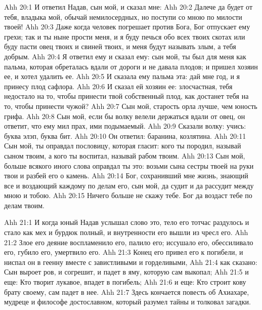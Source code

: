 \vs Ahh 20:1
И ответил Надав, сын мой, и сказал мне:
\vs Ahh 20:2
Далече да будет от тебя, владыка мой, обычай немилосердных, но поступи со мною по милости твоей!
\vs Ahh 20:3
Даже когда человек погрешает против Бога, Бог отпускает ему грехи; так и ты ныне прости меня, и я буду печься обо всех твоих скотах или буду пасти овец твоих и свиней твоих, и меня будут называть злым, а тебя добрым.
\vs Ahh 20:4
Я ответил ему и сказал ему: сын мой, ты был для меня как пальма, которая обреталась вдали от дороги и не давала плодов; и пришел хозяин ее, и хотел удалить ее.
\vs Ahh 20:5
И сказала ему пальма эта: дай мне год, и я принесу плод сафлора.
\vs Ahh 20:6
И сказал ей хозяин ее: злосчастная, тебя недостало на то, чтобы принести твой собственный плод, как достанет тебя на то, чтобы принести чужой?
\vs Ahh 20:7
Сын мой, старость орла лучше, чем юность грифа.
\vs Ahh 20:8
Сын мой, если бы волку велели держаться вдали от овец, он ответит, что ему мил прах, ими подымаемый.
\vs Ahh 20:9
Сказали волку: учись: буква элэп, буква бит.
\vs Ahh 20:10
Он ответил: баранина, козлятина.
\vs Ahh 20:11
Сын мой, ты оправдал пословицу, которая гласит: кого ты породил, называй сыном твоим, а кого ты воспитал, называй рабом твоим.
\vs Ahh 20:13
Сын мой, больше всякого иного слова оправдал ты это: возьми сына сестры твоей на руки твои и разбей его о камень.
\vs Ahh 20:14
Бог, сохранивший мне жизнь, знающий все и воздающий каждому по делам его, сын мой, да судит и да рассудит между мною и тобою.
\vs Ahh 20:15
Ничего больше не скажу тебе. Бог да воздаст тебе по делам твоим.

\vs Ahh 21:1
И когда юный Надав услышал слово это, тело его тотчас раздулось и стало как мех и бурдюк полный, и внутренности его вышли из чресл его.
\vs Ahh 21:2
Злое его деяние воспламенило его, палило его; иссушало его, обессиливало его, губило его, умертвило его.
\vs Ahh 21:3
Конец его привел его к погибели, и ниспал он в геенну вместе с завистливыми и горделивыми,
\vs Ahh 21:4
как сказано: Сын выроет ров, и согрешит, и падет в яму, которую сам выкопал;
\vs Ahh 21:5
и еще: Кто творит лукавое, впадет в погибель;
\vs Ahh 21:6
и еще: Кто строит кову брату своему, сам падет в нее.
\vs Ahh 21:7
Здесь кончается повесть об Ахиахаре, мудреце и философе достославном, который разумел тайны и толковал загадки.
